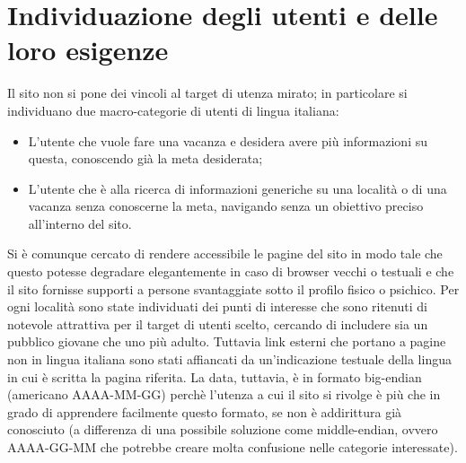 \section{Individuazione degli utenti e delle loro esigenze}
Il sito non si pone dei vincoli al target di utenza mirato; in particolare si individuano due macro-categorie di utenti di lingua italiana:
\begin{itemize}
\item L'utente che vuole fare una vacanza e desidera avere più informazioni su
questa, conoscendo già la meta desiderata;
\item L'utente che è alla ricerca di informazioni generiche su una località o
di una vacanza senza conoscerne la meta, navigando senza un obiettivo preciso
all'interno del sito.
\end{itemize}
Si è comunque cercato di rendere accessibile le pagine del sito in modo tale
che questo potesse degradare elegantemente in caso di browser vecchi o testuali
e che il sito fornisse supporti a persone svantaggiate sotto il profilo fisico
o psichico.
Per ogni località sono state individuati dei punti di interesse che sono
ritenuti di notevole attrattiva per il target di utenti scelto, cercando di
includere sia un pubblico giovane che uno più adulto. Tuttavia link esterni che
portano a pagine non in lingua italiana sono stati affiancati da un'indicazione
testuale della lingua in cui è scritta la pagina riferita.
La data, tuttavia, è in formato big-endian (americano AAAA-MM-GG) perchè
l'utenza a cui il sito si rivolge è più che in grado di apprendere facilmente
questo formato, se non è addirittura già conosciuto (a differenza di una
possibile soluzione come middle-endian, ovvero AAAA-GG-MM che potrebbe creare
molta confusione nelle categorie interessate).
